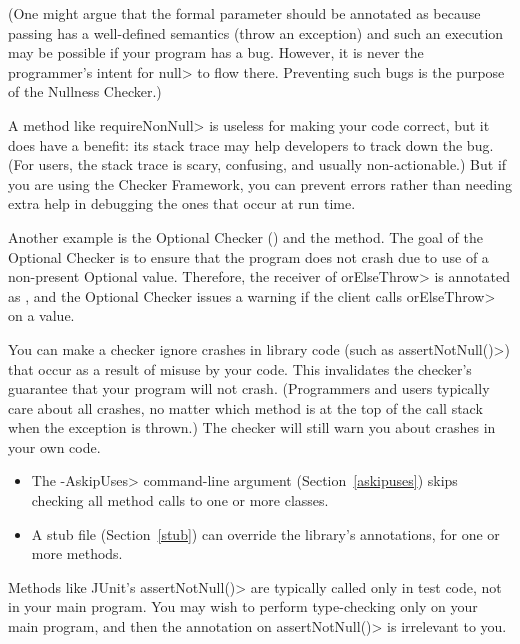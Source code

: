 (One might argue that the formal parameter should be annotated as
 because passing  has a
well-defined semantics (throw an exception) and such an execution may be
possible if your program has a bug.  However, it is never the programmer's
intent for \<null> to flow there.  Preventing such bugs is the purpose of
the Nullness Checker.)

A method like \<requireNonNull> is useless for making your code correct,
but it does have a benefit:  its stack trace may help developers to track
down the bug.  (For users, the stack trace is scary, confusing, and usually
non-actionable.)  But if you are using the Checker Framework, you can
prevent errors rather than needing extra help in debugging the ones that
occur at run time.


Another example is the Optional Checker ()
and the  method.
The goal of the Optional Checker is to ensure that the program does not
crash due to use of a non-present Optional value.  Therefore, the receiver
of
\<orElseThrow> is annotated as
,
and the Optional Checker issues a warning if the client calls
\<orElseThrow> on a  value.


You can make a checker ignore crashes in library code (such as
\<assertNotNull()>) that occur as a result of misuse by your code.
This invalidates the checker's guarantee that your program will not crash.
(Programmers and users typically care about all crashes, no matter which
method is at the top of the call stack when the exception is thrown.)
The checker will still warn you about crashes in your own code.

\begin{itemize}
\item
  The \<-AskipUses> command-line argument (Section~\ref{askipuses}) skips
  checking all method calls to one or more classes.
\item
  A stub file (Section~\ref{stub}) can override the library's annotations,
  for one or more methods.
\end{itemize}

Methods like JUnit's \<assertNotNull()> are typically called only in test
code, not in your main program.  You may wish to perform type-checking only
on your main program, and then the annotation on \<assertNotNull()> is
irrelevant to you.


